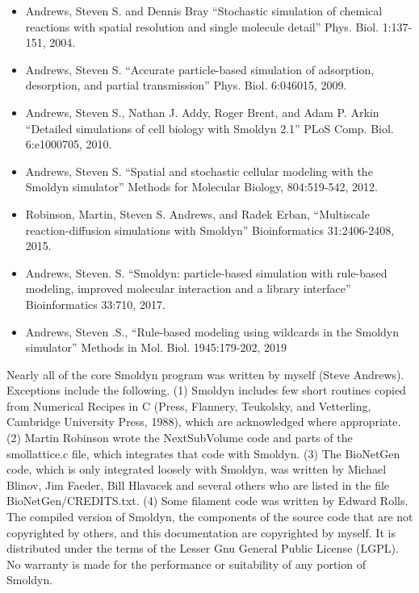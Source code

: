 \documentclass {book}
\begin{document}
\begin{itemize}

\item Andrews, Steven S. and Dennis Bray ``Stochastic simulation of chemical reactions with spatial resolution and single molecule detail'' Phys. Biol. 1:137-151, 2004.

\item Andrews, Steven S. ``Accurate particle-based simulation of adsorption, desorption, and partial transmission'' Phys. Biol. 6:046015, 2009.

\item Andrews, Steven S., Nathan J. Addy, Roger Brent, and Adam P. Arkin ``Detailed simulations of cell biology with Smoldyn 2.1'' PLoS Comp. Biol. 6:e1000705, 2010.

\item Andrews, Steven S. ``Spatial and stochastic cellular modeling with the Smoldyn simulator'' Methods for Molecular Biology, 804:519-542, 2012.

\item Robinson, Martin, Steven S. Andrews, and Radek Erban, ``Multiscale reaction-diffusion simulations with Smoldyn'' Bioinformatics 31:2406-2408, 2015.

\item Andrews, Steven. S. ``Smoldyn: particle-based simulation with rule-based modeling, improved molecular interaction and a library interface'' Bioinformatics 33:710, 2017.

\item Andrews, Steven .S., ``Rule-based modeling using wildcards in the Smoldyn simulator'' Methods in Mol. Biol. 1945:179-202, 2019

\end{itemize}

Nearly all of the core Smoldyn program was written by myself (Steve Andrews). Exceptions include the following. (1) Smoldyn includes few short routines copied from Numerical Recipes in C (Press, Flannery, Teukolsky, and Vetterling, Cambridge University Press, 1988), which are acknowledged where appropriate. (2) Martin Robinson wrote the NextSubVolume code and parts of the smollattice.c file, which integrates that code with Smoldyn. (3) The BioNetGen code, which is only integrated loosely with Smoldyn, was written by Michael Blinov, Jim Faeder, Bill Hlavacek and several others who are listed in the file BioNetGen/CREDITS.txt. (4) Some filament code was written by Edward Rolls. The compiled version of Smoldyn, the components of the source code that are not copyrighted by others, and this documentation are copyrighted by myself. It is distributed under the terms of the Lesser Gnu General Public License (LGPL). No warranty is made for the performance or suitability of any portion of Smoldyn.
\end{document}
